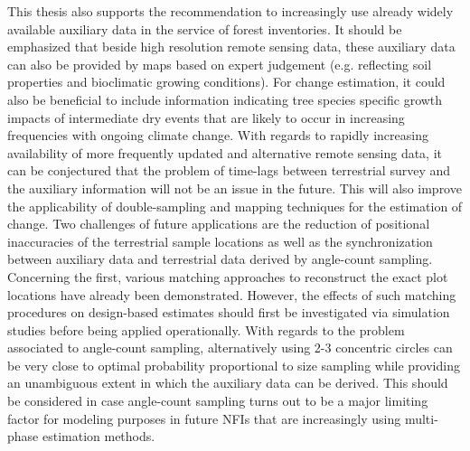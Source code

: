 This thesis also supports the recommendation to increasingly use already widely available auxiliary data in the service of forest inventories. It should be emphasized that beside high resolution remote sensing data, these auxiliary data can also be provided by maps based on expert judgement (e.g. reflecting soil properties and bioclimatic growing conditions). For change estimation, it could also be beneficial to include information indicating tree species specific growth impacts of intermediate dry events that are likely to occur in increasing frequencies with ongoing climate change. With regards to rapidly increasing availability of more frequently updated and alternative remote sensing data, it can be conjectured that the problem of time-lags between terrestrial survey and the auxiliary information will not be an issue in the future. This will also improve the applicability of double-sampling and mapping techniques for the estimation of change. Two challenges of future applications are the reduction of positional inaccuracies of the terrestrial sample locations as well as the synchronization between auxiliary data and terrestrial data derived by angle-count sampling. Concerning the first, various matching approaches to reconstruct the exact plot locations have already been demonstrated. However, the effects of such matching procedures on design-based estimates should first be investigated via simulation studies before being applied operationally. With regards to the problem associated to angle-count sampling, alternatively using 2-3 concentric circles can be very close to optimal probability proportional to size sampling \citep{mandallaz2008} while providing an unambiguous extent in which the auxiliary data can be derived. This should be considered in case angle-count sampling turns out to be a major limiting factor for modeling purposes in future NFIs that are increasingly using multi-phase estimation methods.\par
 
